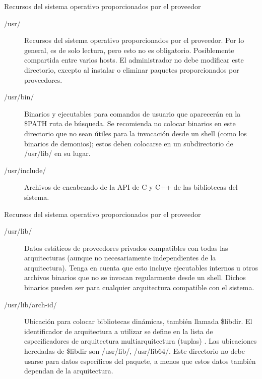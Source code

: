 \begin{frame}[c]{Recursos del sistema operativo proporcionados por el proveedor}
  \begin{description}
    \item [/usr/] Recursos del sistema operativo proporcionados por el
			proveedor. Por lo general, es de solo lectura, pero esto no es
			obligatorio. Posiblemente compartida entre varios hosts.
			El administrador no debe modificar este directorio, excepto al
			instalar o eliminar paquetes proporcionados por proveedores.
    \pausa
    \item [/usr/bin/] Binarios y ejecutables para comandos de usuario que
			aparecerán en la \$PATH ruta de búsqueda. Se recomienda no colocar
			binarios en este directorio que no sean útiles para la invocación
			desde un shell (como los binarios de demonios); estos deben colocarse en
			un subdirectorio de /usr/lib/ en su lugar.
    \pausa
    \item [/usr/include/] Archivos de encabezado de la API de C y C++ de
      las bibliotecas del sistema.
  \end{description}
\end{frame}

\begin{frame}[c]{Recursos del sistema operativo proporcionados por el proveedor}
  \begin{description}
    \item [/usr/lib/] Datos estáticos de proveedores privados compatibles con
      todas las arquitecturas (aunque no necesariamente independientes de la
      arquitectura). Tenga en cuenta que esto incluye ejecutables internos u
      otros archivos binarios que no se invocan regularmente desde un shell.
      Dichos binarios pueden ser para cualquier arquitectura compatible con
      el sistema.
    \pausa
    \item [/usr/lib/arch-id/] Ubicación para colocar bibliotecas dinámicas,
      también llamada \$libdir. El identificador de arquitectura a utilizar
      se define en la lista de especificadores de arquitectura
      multiarquitectura (tuplas) . Las ubicaciones heredadas de \$libdir
      son /usr/lib/, /usr/lib64/. Este directorio no debe usarse para datos
      específicos del paquete, a menos que estos datos también dependan de la
      arquitectura.
  \end{description}
\end{frame}

